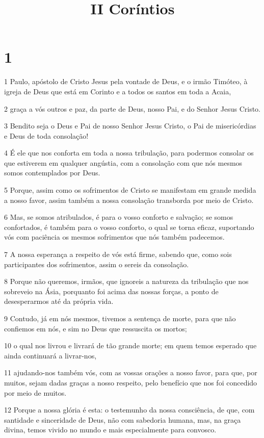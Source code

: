 

\title{II Coríntios}


\chapter{1}

\par 1 Paulo, apóstolo de Cristo Jesus pela vontade de Deus, e o irmão Timóteo, à igreja de Deus que está em Corinto e a todos os santos em toda a Acaia,
\par 2 graça a vós outros e paz, da parte de Deus, nosso Pai, e do Senhor Jesus Cristo.
\par 3 Bendito seja o Deus e Pai de nosso Senhor Jesus Cristo, o Pai de misericórdias e Deus de toda consolação!
\par 4 É ele que nos conforta em toda a nossa tribulação, para podermos consolar os que estiverem em qualquer angústia, com a consolação com que nós mesmos somos contemplados por Deus.
\par 5 Porque, assim como os sofrimentos de Cristo se manifestam em grande medida a nosso favor, assim também a nossa consolação transborda por meio de Cristo.
\par 6 Mas, se somos atribulados, é para o vosso conforto e salvação; se somos confortados, é também para o vosso conforto, o qual se torna eficaz, suportando vós com paciência os mesmos sofrimentos que nós também padecemos.
\par 7 A nossa esperança a respeito de vós está firme, sabendo que, como sois participantes dos sofrimentos, assim o sereis da consolação.
\par 8 Porque não queremos, irmãos, que ignoreis a natureza da tribulação que nos sobreveio na Ásia, porquanto foi acima das nossas forças, a ponto de desesperarmos até da própria vida.
\par 9 Contudo, já em nós mesmos, tivemos a sentença de morte, para que não confiemos em nós, e sim no Deus que ressuscita os mortos;
\par 10 o qual nos livrou e livrará de tão grande morte; em quem temos esperado que ainda continuará a livrar-nos,
\par 11 ajudando-nos também vós, com as vossas orações a nosso favor, para que, por muitos, sejam dadas graças a nosso respeito, pelo benefício que nos foi concedido por meio de muitos.
\par 12 Porque a nossa glória é esta: o testemunho da nossa consciência, de que, com santidade e sinceridade de Deus, não com sabedoria humana, mas, na graça divina, temos vivido no mundo e mais especialmente para convosco.
